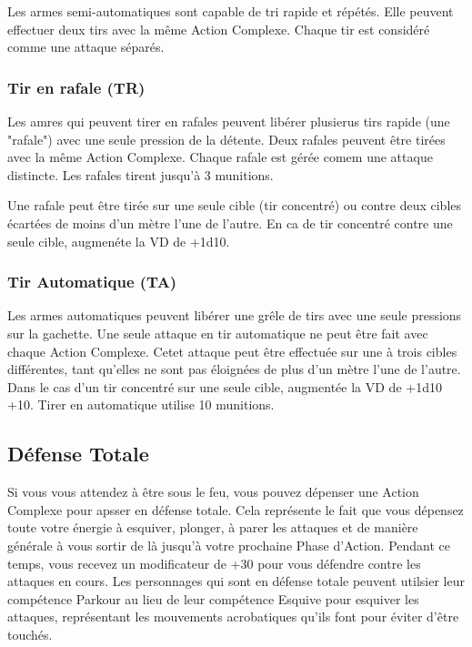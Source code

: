 Les armes semi-automatiques sont capable de tri rapide et répétés. Elle peuvent effectuer deux tirs avec la même Action Complexe. Chaque tir est considéré comme une attaque séparés. 

\subsubsection{Tir en rafale (TR)} 

Les amres qui peuvent tirer en rafales peuvent libérer plusierus tirs rapide (une "rafale") avec une seule pression de la détente. Deux rafales peuvent être tirées avec la même Action Complexe. Chaque rafale est gérée comem une attaque distincte. Les rafales tirent jusqu'à 3 munitions. 

Une rafale peut être tirée sur une seule cible (tir concentré) ou contre deux cibles écartées de moins d'un mètre l'une de l'autre. En ca de tir concentré contre une seule cible, augmenéte la VD de +1d10. 

\subsubsection{Tir Automatique (TA)} 

Les armes automatiques peuvent libérer une grêle de tirs avec une seule pressions sur la gachette. Une seule attaque en tir automatique ne peut être fait avec chaque Action Complexe. Cetet attaque peut être effectuée sur une à trois cibles différentes, tant qu'elles ne sont pas éloignées de plus d'un mètre l'une de l'autre. Dans le cas d'un tir concentré sur une seule cible, augmentée la VD de +1d10 +10. Tirer en automatique utilise 10 munitions. 



\subsection{Défense Totale} \label{sec:full-defense} 

Si vous vous attendez à être sous le feu, vous pouvez dépenser une Action Complexe pour apsser en défense totale. Cela représente le fait que vous dépensez toute votre énergie à esquiver, plonger, à parer les attaques et de manière générale à vous sortir de là jusqu'à votre prochaine Phase d'Action. Pendant ce temps, vous recevez un modificateur de +30 pour vous défendre contre les attaques en cours. Les personnages qui sont en défense totale peuvent utilsier leur compétence Parkour au lieu de leur compétence Esquive pour esquiver les attaques, représentant les mouvements acrobatiques qu'ils font pour éviter d'être touchés. 

